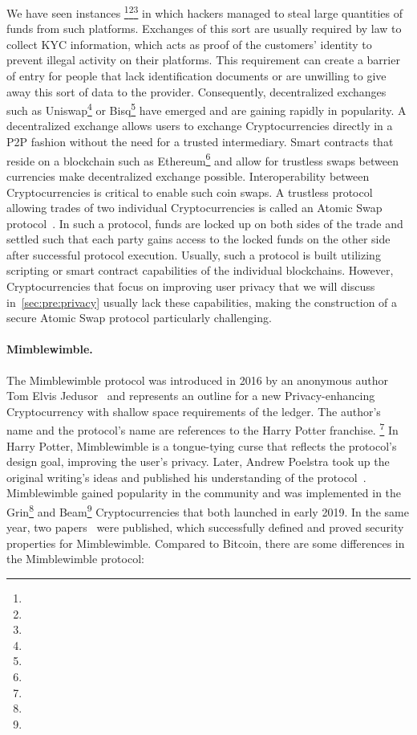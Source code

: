 We have seen instances \footnote{\urlmtgox}\footnote{\urlbitgrail}\footnote{\urlquadriga} in which hackers managed to steal large quantities of funds from such platforms.
Exchanges of this sort are usually required by law to collect KYC information, which acts as proof of the customers' identity to prevent illegal activity on their platforms.
This requirement can create a barrier of entry for people that lack identification documents or are unwilling to give away this sort of data to the provider.
Consequently, decentralized exchanges such as Uniswap\footnote{\urluniswp} or Bisq\footnote{\urlbisq} have emerged and are gaining rapidly in popularity.
A decentralized exchange allows users to exchange Cryptocurrencies directly in a P2P fashion without the need for a trusted intermediary. 
Smart contracts that reside on a blockchain such as Ethereum\footnote{\urlethereum} and allow for trustless swaps between currencies make decentralized exchange possible.
Interoperability between Cryptocurrencies is critical to enable such coin swaps.
A trustless protocol allowing trades of two individual Cryptocurrencies is called an Atomic Swap protocol~\cite{herlihy2018atomic}.
In such a protocol, funds are locked up on both sides of the trade and settled such that each party gains access to the locked funds on the other side after successful protocol execution.
Usually, such a protocol is built utilizing scripting or smart contract capabilities of the individual blockchains.
However, Cryptocurrencies that focus on improving user privacy that we will discuss in~\cref{sec:pre:privacy} usually lack these capabilities, making the construction of a secure Atomic Swap protocol particularly challenging.

\paragraph{Mimblewimble.} The Mimblewimble protocol was introduced in 2016 by an anonymous author Tom Elvis Jedusor~\cite{jedusor2016mimblewimble} and represents an outline for a new Privacy-enhancing Cryptocurrency with shallow space requirements of the ledger.
The author’s name and the protocol's name are references to the Harry Potter franchise. \footnote{\urlharrypotter}
In Harry Potter, Mimblewimble is a tongue-tying curse that reflects the protocol's design goal, improving the user's privacy.
Later, Andrew Poelstra took up the original writing's ideas and published his understanding of the protocol~\cite{poelstra2016mimblewimble}.
Mimblewimble gained popularity in the community and was implemented in the Grin\footnote{\urlgrin} and Beam\footnote{\urlbeam} Cryptocurrencies that both launched in early 2019.
In the same year, two papers~\cite{fuchsbauer2019aggregate,betarte2019towards} were published, which successfully defined and proved security properties for Mimblewimble.
Compared to Bitcoin, there are some differences in the Mimblewimble protocol:

